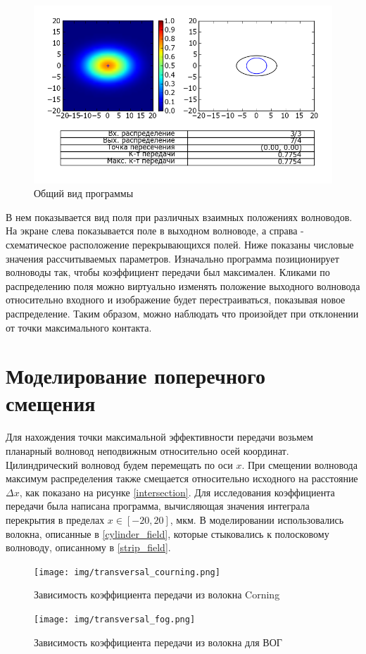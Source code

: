 \begin{figure}[h!]
	\includegraphics[width=\linewidth]{img/heatmap.png}
	\caption{Общий вид программы}
\end{figure}

В нем показывается вид поля при различных взаимных положениях волноводов. На экране слева показывается поле в выходном волноводе, а справа - схематическое расположение перекрывающихся полей. Ниже показаны числовые значения рассчитываемых параметров. Изначально программа позиционирует волноводы так, чтобы коэффициент передачи был максимален. Кликами по распределению поля можно виртуально изменять положение выходного волновода относительно входного и изображение будет перестраиваться, показывая новое распределение. Таким образом, можно наблюдать что произойдет при отклонении от точки максимального контакта.

\section{Моделирование поперечного смещения}
\label{transverse_section}
Для нахождения точки максимальной эффективности передачи возьмем планарный волновод неподвижным относительно осей координат. Цилиндрический волновод будем перемещать по оси $x$. При смещении волновода максимум распределения также смещается относительно исходного на расстояние $\Delta x$, как показано на рисунке \ref{intersection}. Для исследования коэффициента передачи была написана программа, вычисляющая значения интеграла перекрытия в пределах $x \in [-20, 20]$, мкм.
В моделировании использовались волокна, описанные в \ref{cylinder_field}, которые стыковались к полосковому волноводу, описанному в \ref{strip_field}.

\begin{figure}[h!]
		\texttt{[image: img/transversal\_courning.png]}
		\caption{Зависимость коэффициента передачи из волокна Corning}
\end{figure}
\begin{figure}[h!]
		\texttt{[image: img/transversal\_fog.png]}
		\caption{Зависимость коэффициента передачи из волокна для ВОГ}
		\label{transversal_fog}
\end{figure}

